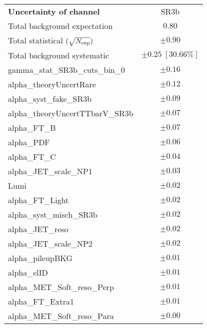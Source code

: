 \begin{table}
\begin{center}
\setlength{\tabcolsep}{0.0pc}
\begin{tabular*}{\textwidth}{@{\extracolsep{\fill}}lc}
\noalign{\smallskip}\hline\noalign{\smallskip}
{\bf Uncertainty of channel}                                    & SR3b            \\
\noalign{\smallskip}\hline\noalign{\smallskip}
Total background expectation             &  $0.80$       \\
\noalign{\smallskip}\hline\noalign{\smallskip}
Total statistical $(\sqrt{N_{\rm exp}})$              & $\pm 0.90$       \\
Total background systematic               & $\pm 0.25\ [30.66\%] $             \\
\noalign{\smallskip}\hline\noalign{\smallskip}
\noalign{\smallskip}\hline\noalign{\smallskip}
gamma\_stat\_SR3b\_cuts\_bin\_0         & $\pm 0.16$       \\
alpha\_theoryUncertRare         & $\pm 0.12$       \\
alpha\_syst\_fake\_SR3b         & $\pm 0.09$       \\
alpha\_theoryUncertTTbarV\_SR3b         & $\pm 0.07$       \\
alpha\_FT\_B         & $\pm 0.07$       \\
alpha\_PDF         & $\pm 0.06$       \\
alpha\_FT\_C         & $\pm 0.04$       \\
alpha\_JET\_scale\_NP1         & $\pm 0.03$       \\
Lumi         & $\pm 0.02$       \\
alpha\_FT\_Light         & $\pm 0.02$       \\
alpha\_syst\_misch\_SR3b         & $\pm 0.02$       \\
alpha\_JET\_reso         & $\pm 0.02$       \\
alpha\_JET\_scale\_NP2         & $\pm 0.02$       \\
alpha\_pileupBKG         & $\pm 0.01$       \\
alpha\_elID         & $\pm 0.01$       \\
alpha\_MET\_Soft\_reso\_Perp         & $\pm 0.01$       \\
alpha\_FT\_Extra1         & $\pm 0.01$       \\
alpha\_MET\_Soft\_reso\_Para         & $\pm 0.00$       \\

\end{tabular*}
\end{center}
\end{table}
